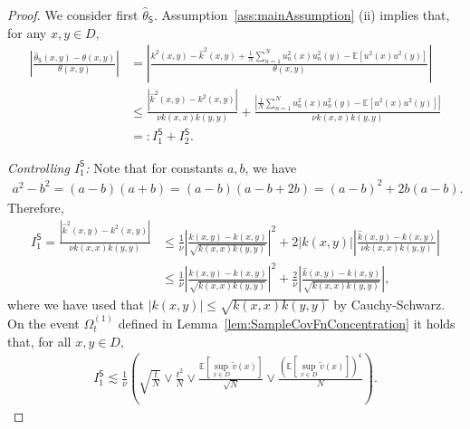 \documentclass[10pt,a4paper]{amsart}
\newcommand{\E}{\mathbb{E}}
\newcommand{\abs}[1]{\ensuremath{\left\lvert #1 \right\rvert}}
\newcommand{\hatk}{\hat{k}}
\newcommand{\hattheta}{\hat{\theta}}
\newcommand{\inparen}[1]{\left(#1\right)}             %
\newcommand{\tildev}{\tilde{v}}
\begin{document}
\begin{proof}
    We consider first $\hattheta_{\mathsf{S}}$. Assumption~\ref{ass:mainAssumption} (ii) implies that, for any $x,y \in D,$
    \begin{align*}
        \abs{
        \frac{\hattheta_{\mathsf{S}}(x,y)-\theta(x,y)
        }{\theta(x,y)}
        }
        &=
        \abs{ 
        \frac{k^2(x,y) - \hatk^2(x,y)
        +
        \frac{1}{N} \sum_{n=1}^N 
        u_n^2(x)u_n^2(y) 
        -
        \E [u^2(x)u^2(y)]
        }{\theta(x,y)}}
        \\
        &\le 
        \frac{
        \abs {\hatk^2(x,y)- k^2(x,y)}}
        {\nu k(x,x)k(y,y)}
        +
        \frac{
        \abs{
        \frac{1}{N} \sum_{n=1}^N 
        u_n^2(x)u_n^2(y) 
        -
        \E [u^2(x)u^2(y)]
        }}{\nu k(x,x)k(y,y)}\\
        &=: I^{\mathsf{S}}_1 + I^{\mathsf{S}}_2.
    \end{align*}

    \textit{Controlling $I^{\mathsf{S}}_1$:} Note that for constants $a,b$, we have 
    \begin{align*}
        a^2 - b^2 = (a-b)(a+b) = (a-b)(a-b+2b) = (a-b)^2 + 2b(a-b).
    \end{align*}
    Therefore, 
    \begin{align*}
        I^{\mathsf{S}}_1
        =
        \frac{
        \abs {\hatk^2(x,y)- k^2(x,y)}}
        {\nu k(x,x)k(y,y)}
        &\le 
        \frac{1}{\nu}
        \abs{
        \frac{\hatk(x,y) - k(x,y)}{ \sqrt{k(x,x)k(y,y)}}
        }^2
        +2 |k(x,y)| \abs{
        \frac{\hatk(x,y) - k(x,y)}{\nu k(x,x)k(y,y)}
        }\\
        &\le 
        \frac{1}{\nu} 
        \abs{
        \frac{\hatk(x,y) - k(x,y)}{\sqrt{k(x,x)k(y,y)}}
        }^2
        +\frac{2}{\nu} \abs{
        \frac{\hatk(x,y) - k(x,y)}{\sqrt{k(x,x)k(y,y)}}
        },
    \end{align*}
    where we have used that $|k(x,y)| \le \sqrt{k(x,x)k(y,y)}$ by Cauchy-Schwarz. On the event $\Omega_{t}^{(1)}$ defined in Lemma~\ref{lem:SampleCovFnConcentration} it holds that, for all $x,y \in D,$
    \begin{align*}
        I^{\mathsf{S}}_1 
        \lesssim
        \frac{1}{\nu} 
        \inparen{\sqrt{\frac{t}{N}} \lor \frac{t^2}{N} \lor 
        \frac{\E[\sup_{x\in D} \tildev(x)]}{\sqrt{N}} \lor \frac{(\E[\sup_{x\in D} \tildev(x)])^4}{N}}.
    \end{align*}


\end{proof}
\end{document}

